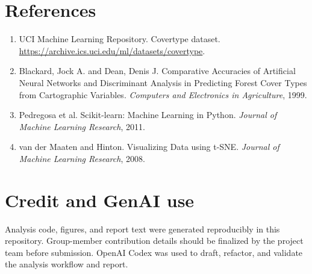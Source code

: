 \documentclass{article}
\begin{document}
\section*{References}
\begin{enumerate}[leftmargin=*, itemsep=0.25em]
  \item UCI Machine Learning Repository. Covertype dataset. \url{https://archive.ics.uci.edu/ml/datasets/covertype}.
  \item Blackard, Jock A. and Dean, Denis J. Comparative Accuracies of Artificial Neural Networks and Discriminant Analysis in Predicting Forest Cover Types from Cartographic Variables. \emph{Computers and Electronics in Agriculture}, 1999.
  \item Pedregosa et al. Scikit-learn: Machine Learning in Python. \emph{Journal of Machine Learning Research}, 2011.
  \item van der Maaten and Hinton. Visualizing Data using t-SNE. \emph{Journal of Machine Learning Research}, 2008.
\end{enumerate}

\section*{Credit and GenAI use}
Analysis code, figures, and report text were generated reproducibly in this repository. Group-member contribution details should be finalized by the project team before submission. OpenAI Codex was used to draft, refactor, and validate the analysis workflow and report.
\end{document}

